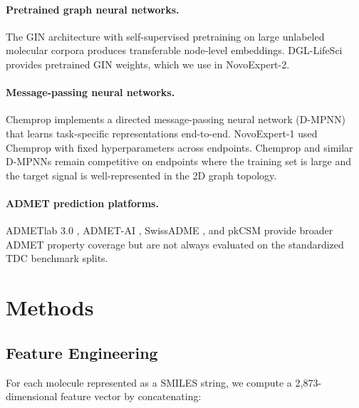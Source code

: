 \documentclass[11pt]{article}
\begin{document}
\paragraph{Pretrained graph neural networks.}
The GIN architecture \citep{xu2019gin} with self-supervised pretraining on large unlabeled molecular corpora \citep{hu2020gin} produces transferable node-level embeddings. DGL-LifeSci \citep{li2021dgllife} provides pretrained GIN weights, which we use in NovoExpert-2.

\paragraph{Message-passing neural networks.}
Chemprop \citep{yang2019analyzing} implements a directed message-passing neural network (D-MPNN) that learns task-specific representations end-to-end. NovoExpert-1 \citep{harrison2026novoexpert1} used Chemprop with fixed hyperparameters across endpoints. Chemprop and similar D-MPNNs remain competitive on endpoints where the training set is large and the target signal is well-represented in the 2D graph topology.

\paragraph{ADMET prediction platforms.}
ADMETlab 3.0 \citep{fu2024admetlab}, ADMET-AI \citep{swanson2023admetai}, SwissADME \citep{daina2017swissadme}, and pkCSM \citep{pires2015pkcsm} provide broader ADMET property coverage but are not always evaluated on the standardized TDC benchmark splits.

\section{Methods}

\subsection{Feature Engineering}

For each molecule represented as a SMILES string, we compute a 2{,}873-dimensional feature vector by concatenating:
\end{document}
